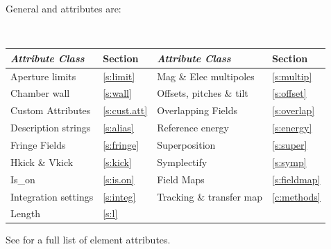 General  and  attributes are:
\begin{center}
\tt
\begin{tabular}{llll} \toprule
  {\sl Attribute Class}      & Section           & {\sl Attribute Class}      & Section          \\ \midrule
  Aperture limits            & \ref{s:limit}     & Mag \& Elec multipoles     & \ref{s:multip}   \\ 
  Chamber wall               & \ref{s:wall}      & Offsets, pitches \& tilt   & \ref{s:offset}   \\
  Custom Attributes          & \ref{s:cust.att}  & Overlapping Fields         & \ref{s:overlap}  \\
  Description strings        & \ref{s:alias}     & Reference energy           & \ref{s:energy}   \\ 
  Fringe Fields              & \ref{s:fringe}    & Superposition              & \ref{s:super}    \\
  Hkick \& Vkick             & \ref{s:kick}      & Symplectify                & \ref{s:symp}     \\
  Is_on                      & \ref{s:is.on}     & Field Maps                 & \ref{s:fieldmap} \\
  Integration settings       & \ref{s:integ}     & Tracking \& transfer map   & \ref{c:methods}  \\
  Length                     & \ref{s:l}         &                            &                  \\
  \bottomrule
\end{tabular}
\end{center}
\toffset
See  for a full list of element attributes.

